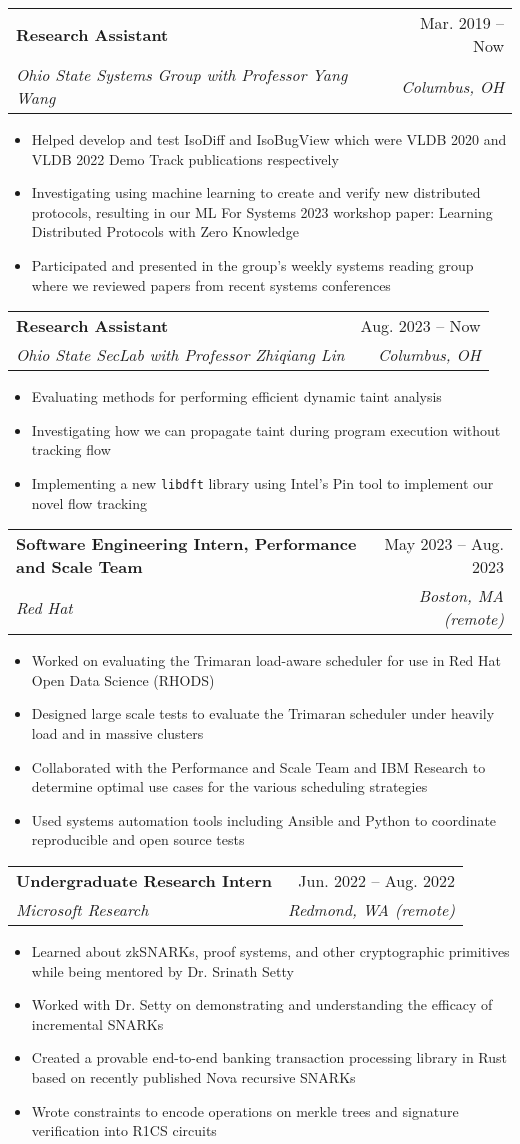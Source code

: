 \documentclass[letterpaper,11pt]{article}
\makeatletter
\newcommand{\resumeItem}[1]{
  \item\small{
    {#1 \vspace{-2pt}}
  }
}
\newcommand{\resumeSubheading}[4]{
  \vspace{-2pt}\item
    \begin{tabular*}{0.97\textwidth}[t]{l@{\extracolsep{\fill}}r}
      \textbf{#1} & #2 \\
      \textit{\small#3} & \textit{\small #4} \\
    \end{tabular*}\vspace{-7pt}
}
\newcommand{\resumeItemListStart}{\begin{itemize}}
\newcommand{\resumeItemListEnd}{\end{itemize}\vspace{-5pt}}
\makeatother
\begin{document}
    \resumeSubheading
      {Research Assistant}{Mar. 2019 -- Now}
      {Ohio State Systems Group with Professor Yang Wang}{Columbus, OH}
      \resumeItemListStart
        \resumeItem{Helped develop and test IsoDiff and IsoBugView which were VLDB 2020 and VLDB 2022 Demo Track publications respectively}
        \resumeItem{Investigating using machine learning to create and verify new distributed protocols, resulting in our ML For Systems 2023 workshop paper: Learning Distributed Protocols with Zero Knowledge}
        \resumeItem{Participated and presented in the group's weekly systems reading group where we reviewed papers from recent systems conferences}
      \resumeItemListEnd

    \resumeSubheading
      {Research Assistant}{Aug. 2023 -- Now}
      {Ohio State SecLab with Professor Zhiqiang Lin}{Columbus, OH}
      \resumeItemListStart
        \resumeItem{Evaluating methods for performing efficient dynamic taint analysis}
        \resumeItem{Investigating how we can propagate taint during program execution without tracking flow}
        \resumeItem{Implementing a new \texttt{libdft} library using Intel's Pin tool to implement our novel flow tracking}
      \resumeItemListEnd

      \resumeSubheading
      {Software Engineering Intern, Performance and Scale Team}{May 2023 -- Aug. 2023}
      {Red Hat}{Boston, MA (remote)}
      \resumeItemListStart
        \resumeItem{Worked on evaluating the Trimaran load-aware scheduler for use in Red Hat Open Data Science (RHODS)}
        \resumeItem{Designed large scale tests to evaluate the Trimaran scheduler under heavily load and in massive clusters}
        \resumeItem{Collaborated with the Performance and Scale Team and IBM Research to determine optimal use cases for the various scheduling strategies}
        \resumeItem{Used systems automation tools including Ansible and Python to coordinate reproducible and open source tests}
      \resumeItemListEnd

      \resumeSubheading
      {Undergraduate Research Intern}{Jun. 2022 -- Aug. 2022}
      {Microsoft Research}{Redmond, WA (remote)}
      \resumeItemListStart
        \resumeItem{Learned about zkSNARKs, proof systems, and other cryptographic primitives while being mentored by Dr. Srinath Setty}
        \resumeItem{Worked with Dr. Setty on demonstrating and understanding the efficacy of incremental SNARKs}
        \resumeItem{Created a provable end-to-end banking transaction processing library in Rust based on recently published Nova recursive SNARKs}
        \resumeItem{Wrote constraints to encode operations on merkle trees and signature verification into R1CS circuits}
      \resumeItemListEnd
\end{document}
